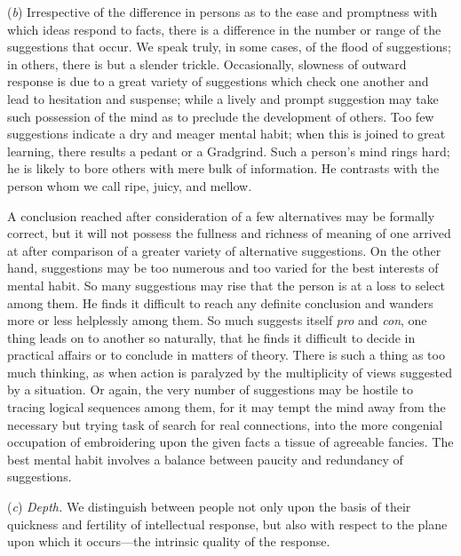\documentclass[showtrims,ustradepaper]{memoir}
\begin{document}

(\emph{b}) Irrespective of the difference in persons as to the ease and
promptness with which ideas respond to facts, there is a difference in
the number or range of the suggestions that occur. We speak truly, in
some cases, of the flood of suggestions; in others, there is but a
slender trickle. Occasionally, slowness of
outward
response is due to a great variety of suggestions which check one
another and lead to hesitation and suspense; while a lively and prompt
suggestion may take such possession of the mind as to preclude the
development of others. Too few suggestions indicate a dry and meager
mental habit; when this is joined to great learning, there results a
pedant or a Gradgrind. Such a person's mind rings hard; he is likely to
bore others with mere bulk of information. He contrasts with the person
whom we call ripe, juicy, and mellow.

A conclusion reached after consideration of a few alternatives may be
formally correct, but it will not possess the fullness and richness of
meaning of one arrived at after comparison of a greater variety of
alternative suggestions. On the other hand, suggestions may be too
numerous and too varied for the best interests of mental habit. So many
suggestions may rise that the person is at a loss to select among them.
He finds it difficult to reach any definite conclusion and wanders more
or less helplessly among them. So much suggests itself \emph{pro} and
\emph{con}, one thing leads on to another so naturally, that he finds it
difficult to decide in practical affairs or to conclude in matters of
theory. There is such a thing as too much thinking, as when action is
paralyzed by the multiplicity of views suggested by a situation. Or
again, the very number of suggestions may be hostile to tracing logical
sequences among them, for it may tempt the mind away from the necessary
but trying task of search for real connections, into the more congenial
occupation of embroidering upon the given facts a tissue of agreeable
fancies. The best mental habit involves a balance between paucity and
redundancy of
suggestions.


(\emph{c}) \emph{Depth.} We distinguish between people not only upon the
basis of their quickness and fertility of intellectual response, but
also with respect to the plane upon which it occurs---the intrinsic
quality of the response.
\end{document}
